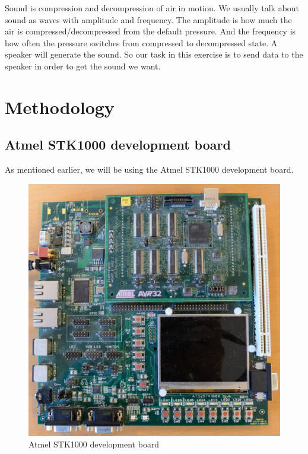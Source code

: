 \documentclass[12pt,a4paper,final]{report}
\numberwithin{equation}{section}
\numberwithin{table}{section}
\numberwithin{figure}{section}
\begin{document}
Sound is compression and decompression of air in motion. We usually talk about sound as waves with amplitude and frequency. The amplitude is how much the air is compressed/decompressed from the default pressure. And the frequency is how often the pressure switches from compressed to decompressed state. A speaker will generate the sound. So our task in this exercise is to send data to the speaker in order to get the sound we want. 

\newpage

\section{Methodology}
\label{sec:methodology}

\subsection{Atmel STK1000 development board}
\label{sec:stk1000}
As mentioned earlier, we will be using the Atmel STK1000 development board. 


\begin{figure}[H]
\centering
\includegraphics[scale=1.5]{stk1000photo}
\caption{Atmel STK1000 development board}
\label{fig:stk1000}
\end{figure}
\end{document}
